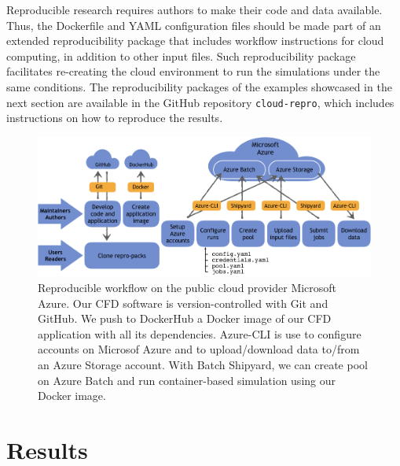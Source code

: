 \documentclass[10pt,journal,compsoc]{IEEEtran}
\begin{document}
Reproducible research requires authors to make their code and data available.
Thus, the Dockerfile and YAML configuration files should be made part of an extended reproducibility package that includes workflow instructions for cloud computing, in addition to other input files.
Such reproducibility package facilitates re-creating the cloud environment to run the simulations under the same conditions.
The reproducibility packages of the examples showcased in the next section are available in the GitHub repository \texttt{cloud-repro}, which includes instructions on how to reproduce the results.

\begin{figure}[!h]
    \centering
    \includegraphics[width=16cm]{figures/cloud_workflow.png}
    \caption{Reproducible workflow on the public cloud provider Microsoft Azure. Our CFD software is version-controlled with Git and GitHub. We push to DockerHub a Docker image of our CFD application with all its dependencies. Azure-CLI is use to configure accounts on Microsof Azure and to upload/download data to/from an Azure Storage account. With Batch Shipyard, we can create pool on Azure Batch and run container-based simulation using our Docker image.}
    \label{fig:cloud_workflow}
\end{figure}

\section{Results}\label{sec:results}
\end{document}
